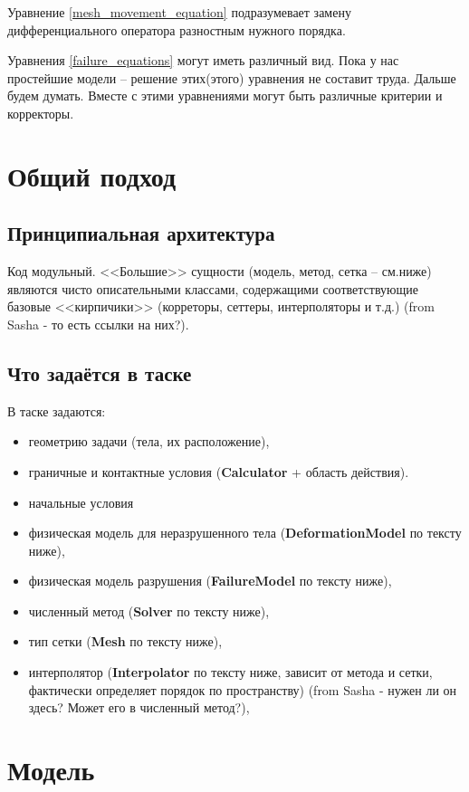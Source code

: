 \documentclass[a4paper,12pt]{article}
\numberwithin{equation}{section}
\begin{document}
	Уравнение \eqref{mesh_movement_equation} подразумевает замену дифференциального оператора разностным нужного порядка.
	
	Уравнения \eqref{failure_equations} могут иметь различный вид. Пока у нас простейшие модели -- решение этих(этого) уравнения не составит труда. Дальше будем думать.
	Вместе с этими уравнениями могут быть различные критерии и корректоры.
	

\section{Общий подход}

\subsection{Принципиальная архитектура}

Код модульный. <<Большие>> сущности (модель, метод, сетка -- см.ниже) являются чисто описательными классами, содержащими соответствующие базовые <<кирпичики>> (корреторы, сеттеры, интерполяторы и т.д.) (from Sasha - то есть ссылки на них?).

\subsection{Что задаётся в таске}

В таске задаются:
	\begin{itemize}
		\item{геометрию задачи (тела, их расположение),}
		\item{граничные и контактные условия (\textbf{Calculator} + область действия).}
		\item{начальные условия}
		\item{физическая модель для неразрушенного тела (\textbf{DeformationModel} по тексту ниже),}
		\item{физическая модель разрушения (\textbf{FailureModel} по тексту ниже),}
		\item{численный метод (\textbf{Solver} по тексту ниже),}
		\item{тип сетки (\textbf{Mesh} по тексту ниже),}
		\item{интерполятор (\textbf{Interpolator} по тексту ниже, зависит от метода и сетки, фактически определяет порядок по пространству) (from Sasha - нужен ли он здесь? Может его в численный метод?),}
	\end{itemize}

\section{Модель}
\end{document}
